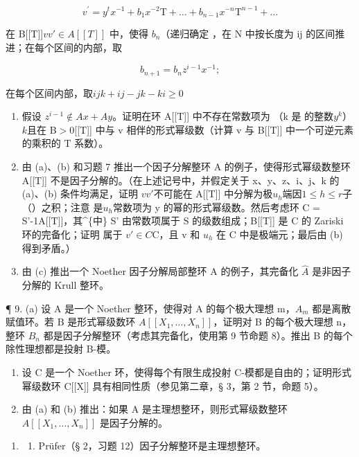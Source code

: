 \[
v ^ {\prime} = y ^ {t} x ^ {- 1} + b _ {1} x ^ {- 2} \mathrm{T} + \dots + b _ {n - 1} x ^ {- n} \mathrm{T} ^ {n - 1} + \dots
\]

在 {}{}B{}{}[[T]]\(vv' \in A[[T]]\) 中，使得 \(b_{n}\)（递归确定 ，在 N 中按长度为 ij 的区间推进；在每个区间的内部，取

\[
b _ {n + 1} = b _ {n} z ^ {i - 1} x ^ {- 1};
\]

在每个区间内部，取\(ijk + ij - jk - ki \geqslant 0\) 

\begin{enumerate}
\def\labelenumi{(\alph{enumi})}
\setcounter{enumi}{1}
\item
  假设 \(z^{i-1} \notin Ax + Ay\)。证明在环 A[[T]] 中{不}{}{存}{}在常数项为 （k 是  的整数\(y^k\)）\(k\)且在 B\(>0\)[[T]] 中与 v 相伴的形式幂级{}{数}{}{（}计算 v 与 B[[T]] 中一个可逆元素的乘积的 T 系{数}{}）{}{}。
\item
  由 (a)、(b) 和习题 7 推出一个因子分解整环 A 的例子，使得形式幂级数整环 A[[T{}{]}{}{]} 不是因子分解的。（在上述记号中，并假定关于 x、y、z、i、j、k 的 (a)、(b) 条件均满足，证明  \(vv'\)不可能在 A[[T]] 中分解为极\(u_{h}\)端因\(1 \leqslant h \leqslant r\)子 {（}{}）{}{之}积；注意  是\(u_{h}\)常数项为 y 的幂的形式幂级数。然后考虑环 C = S'-1A[[T]]，其\^{}\{中\} {}{}S{}{'} 由常数项属于 S 的级数组成；B[[T]] 是 C{}{ }{的}{} Zariski 环的完备化；证明  属于 \(v' \in C\)C，且 v 和 \(u_{h}\) 在 C 中是极端元；最后由 (b) 得到矛盾。）
\item
  由 (c) 推出一个 Noether 因子分解局部整环 A 的例子，其完备化 \(\hat{A}\) 是非因子分解的 Krull 整环。
\end{enumerate}

¶ 9. (a) 设 A 是一个 Noether 整环，使得对 A 的每个极大理想 m，\(A_{m}\) 都是离散赋值环。若 B 是形式幂级数环 \(A[[X_{1},\ldots,X_{n}]]\)，证明对 B 的每个极大理想 n，整环 \(B_{n}\) 都是因子分解整环（考虑其完备化，使用第 9 节命题 8）。推出 B 的每个除性理想都是投射 B-模。

\begin{enumerate}
\def\labelenumi{(\alph{enumi})}
\setcounter{enumi}{1}
\item
  设 C 是一个 Noether 环，使得每个有限生成投射 C-模都是自由的；证明形式幂级数环 C{[}{[}X{]}{]} 具有相同性质（参见第二章，§ 3，第 2 节，命题 5）。
\item
  由 (a) 和 (b) 推出：如果 A 是主理想整环，则形式幂级数整环 \(A[[X_{1},\ldots,X_{n}]]\) 是因子分解的。
\end{enumerate}

\begin{enumerate}
\def\labelenumi{\arabic{enumi}.}
\setcounter{enumi}{9}
\tightlist
\item
  \begin{enumerate}
  \def\labelenumii{(\alph{enumii})}
  \tightlist
  \item
    Prüfer（§ 2，习题 12）因子分解整环是主理想整环。
  \end{enumerate}
\end{enumerate}

